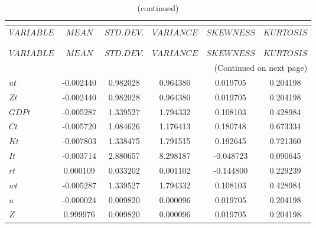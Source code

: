  
\begin{center}
\begin{longtable}{lccccc} 
\caption{MOMENTS OF SIMULATED VARIABLES}\\
 \label{Table:sim_moments}\\
\toprule 
$VARIABLE  $	 & 	 $            MEAN$	 & 	 $       STD. DEV.$	 & 	 $        VARIANCE$	 & 	 $        SKEWNESS$	 & 	 $        KURTOSIS$\\
\midrule \endfirsthead 
\caption{(continued)}\\
 \toprule \\ 
$VARIABLE  $	 & 	 $            MEAN$	 & 	 $       STD. DEV.$	 & 	 $        VARIANCE$	 & 	 $        SKEWNESS$	 & 	 $        KURTOSIS$\\
\midrule \endhead 
\midrule \multicolumn{6}{r}{(Continued on next page)} \\ \bottomrule \endfoot 
\bottomrule \endlastfoot 
$ut        $	 & 	       -0.002440	 & 	        0.982028	 & 	        0.964380	 & 	        0.019705	 & 	        0.204198 \\ 
$Zt        $	 & 	       -0.002440	 & 	        0.982028	 & 	        0.964380	 & 	        0.019705	 & 	        0.204198 \\ 
$GDPt      $	 & 	       -0.005287	 & 	        1.339527	 & 	        1.794332	 & 	        0.108103	 & 	        0.428984 \\ 
$Ct        $	 & 	       -0.005720	 & 	        1.084626	 & 	        1.176413	 & 	        0.180748	 & 	        0.673334 \\ 
$Kt        $	 & 	       -0.007803	 & 	        1.338475	 & 	        1.791515	 & 	        0.192645	 & 	        0.721360 \\ 
$It        $	 & 	       -0.003714	 & 	        2.880657	 & 	        8.298187	 & 	       -0.048723	 & 	        0.090645 \\ 
$rt        $	 & 	        0.000109	 & 	        0.033202	 & 	        0.001102	 & 	       -0.144800	 & 	        0.229239 \\ 
$wt        $	 & 	       -0.005287	 & 	        1.339527	 & 	        1.794332	 & 	        0.108103	 & 	        0.428984 \\ 
$u         $	 & 	       -0.000024	 & 	        0.009820	 & 	        0.000096	 & 	        0.019705	 & 	        0.204198 \\ 
$Z         $	 & 	        0.999976	 & 	        0.009820	 & 	        0.000096	 & 	        0.019705	 & 	        0.204198 \\ 

\end{longtable}
\end{center}
